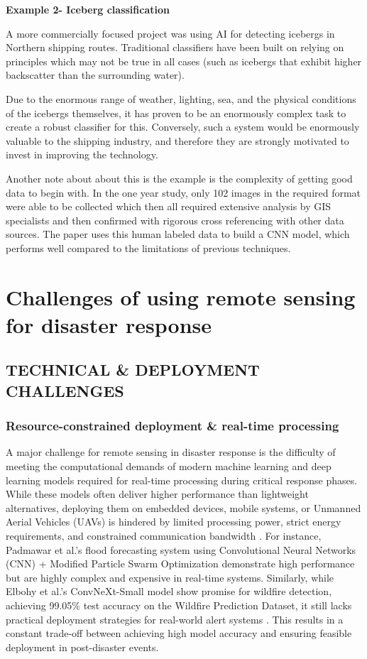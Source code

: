 \documentclass[conference,a4paper]{IEEEtran}
\begin{document}
\textbf{Example 2- Iceberg classification}

A more commercially focused project was using AI for detecting icebergs in Northern shipping routes. Traditional classifiers have been built on relying on principles which may not be true in all cases (such as icebergs that exhibit higher backscatter than the surrounding water). 

Due to the enormous range of weather, lighting, sea,  and the physical conditions of the icebergs themselves, it has proven to be an enormously complex task to create a robust classifier for this. Conversely, such a system would be enormously valuable to the shipping industry, and therefore they are strongly motivated to invest in improving the technology.

Another note about about this is the example is the complexity of getting good data to begin with. In the one year study, only 102 images in the required format were able to be collected which then all required extensive analysis by GIS specialists and then confirmed with rigorous cross referencing with other data sources. The paper uses this human labeled data to build a CNN model, which performs well compared to the limitations of previous techniques.




\section{Challenges of using remote sensing for disaster response}


\subsection{TECHNICAL \& DEPLOYMENT CHALLENGES}


\subsubsection{\textbf{Resource-constrained deployment \& real-time processing}}
A major challenge for remote sensing in disaster response is the difficulty of meeting the computational demands of modern machine learning and deep learning models required for real-time processing during critical response phases. While these models often deliver higher performance than lightweight alternatives, deploying them on embedded devices, mobile systems, or Unmanned Aerial Vehicles (UAVs) is hindered by limited processing power, strict energy requirements, and constrained communication bandwidth \cite{elbohy2025fusion}. For instance, Padmawar et al.'s flood forecasting system using Convolutional Neural Networks (CNN) + Modified Particle Swarm Optimization demonstrate high performance but are highly complex and expensive in real-time systems. Similarly, while Elbohy et al.'s ConvNeXt-Small model show promise for wildfire detection, achieving 99.05\% test accuracy on the Wildfire Prediction Dataset, it still lacks practical deployment strategies for real-world alert systems \cite{elbohy2025fusion}. This results in a constant trade-off between achieving high model accuracy and ensuring feasible deployment in post-disaster events.
\end{document}
